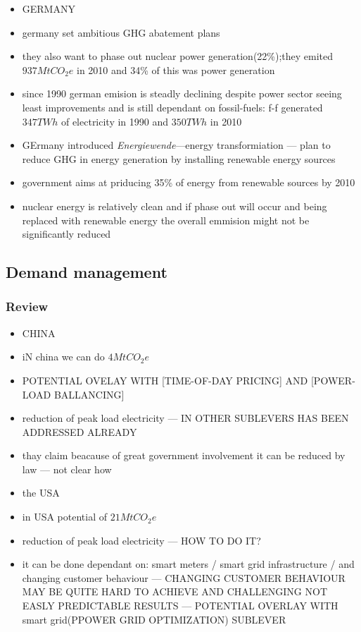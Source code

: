 \documentclass[11pt, twocolumn]{article}
\begin{document}
\begin{itemize}
\item GERMANY
\item germany set ambitious GHG abatement plans
\item they also want to phase out nuclear power generation(22\%);they emited $937 MtCO_2e$ in 2010 and 34\% of this was power generation
\item since 1990 german emision is steadly declining despite power sector seeing least improvements and is still dependant on fossil-fuels: f-f generated $347 TWh$ of electricity in 1990 and $350 TWh$ in 2010
\item GErmany introduced \emph{Energiewende}---energy transformiation --- plan to reduce GHG in energy generation by installing renewable energy sources
\item government aims at priducing 35\% of energy from renewable sources by 2010
\item nuclear energy is relatively clean and if phase out will occur and being replaced with renewable energy the overall emmision might not be significantly reduced


\end{itemize}

\subsection{Demand management}
\subsubsection{Review}
\begin{itemize}
\item CHINA
\item iN china we can do $4 Mt CO_2e$
\item POTENTIAL OVELAY WITH [TIME-OF-DAY PRICING] AND [POWER-LOAD BALLANCING]
\item reduction of peak load electricity --- IN OTHER SUBLEVERS HAS BEEN ADDRESSED ALREADY
\item thay claim beacause of great government involvement it can be reduced by law --- not clear how

\item the USA
\item in USA potential of $21 MtCO_2e$
\item reduction of peak load electricity --- HOW TO DO IT?
\item it can be done dependant on: smart meters / smart grid infrastructure / and changing customer behaviour --- CHANGING CUSTOMER BEHAVIOUR MAY BE QUITE HARD TO ACHIEVE AND CHALLENGING NOT EASLY PREDICTABLE RESULTS --- POTENTIAL OVERLAY WITH smart grid(PPOWER GRID OPTIMIZATION) SUBLEVER


\end{itemize}
\end{document}
